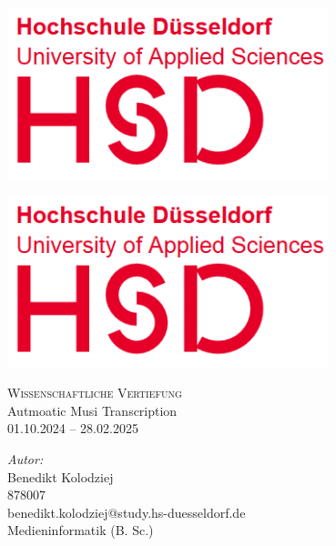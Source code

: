 \usepackage{graphicx}
\begin{titlepage}
    \thispagestyle{empty}

    \vspace*{1cm} %
    \begin{minipage}{0.45\textwidth}
        \raggedright
        \includegraphics[width=0.7\textwidth]{Graphics/HSDLogo} %
    \end{minipage}%
    \hfill
    \begin{minipage}{0.45\textwidth}
        \raggedleft
        \includegraphics[width=0.7\textwidth]{Graphics/HSDLogo} %
    \end{minipage}

    \vspace{1.5cm} %

    \center

    \textsc{\large Wissenschaftliche Vertiefung}\\
    \vspace{0.5cm}
    \Large{Autmoatic Musi Transcription}\\
    \small{01.10.2024 – 28.02.2025}
    \vspace{2cm}

    \begin{center}
        \textit{Autor:} \\
        Benedikt Kolodziej \\
        878007 \\
        benedikt.kolodziej@study.hs-duesseldorf.de   \\
        Medieninformatik (B. Sc.) \\[1cm]


\end{center}
\end{titlepage}
